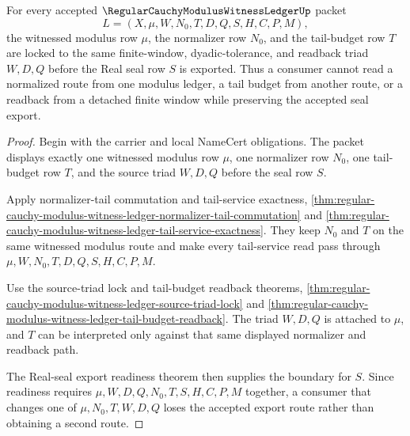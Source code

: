 
\begin{theorem}
\label{thm:regular-cauchy-modulus-witness-ledger-modulus-normalizer-tail-coherence}
For every accepted $\RegularCauchyModulusWitnessLedgerUp$ packet
$$
L=(X,\mu,W,N_0,T,D,Q,S,H,C,P,M),
$$
the witnessed modulus row $\mu$, the normalizer row $N_0$, and the tail-budget row $T$ are locked to the same finite-window, dyadic-tolerance, and readback triad $W,D,Q$ before the Real seal row $S$ is exported. Thus a consumer cannot read a normalized route from one modulus ledger, a tail budget from another route, or a readback from a detached finite window while preserving the accepted seal export.
\end{theorem}
\begin{proof}
Begin with the carrier and local NameCert obligations. The packet displays exactly one witnessed modulus row $\mu$, one normalizer row $N_0$, one tail-budget row $T$, and the source triad $W,D,Q$ before the seal row $S$.

Apply normalizer-tail commutation and tail-service exactness, \autoref{thm:regular-cauchy-modulus-witness-ledger-normalizer-tail-commutation} and \autoref{thm:regular-cauchy-modulus-witness-ledger-tail-service-exactness}. They keep $N_0$ and $T$ on the same witnessed modulus route and make every tail-service read pass through $\mu,W,N_0,T,D,Q,S,H,C,P,M$.

Use the source-triad lock and tail-budget readback theorems, \autoref{thm:regular-cauchy-modulus-witness-ledger-source-triad-lock} and \autoref{thm:regular-cauchy-modulus-witness-ledger-tail-budget-readback}. The triad $W,D,Q$ is attached to $\mu$, and $T$ can be interpreted only against that same displayed normalizer and readback path.

The Real-seal export readiness theorem then supplies the boundary for $S$. Since readiness requires $\mu,W,D,Q,N_0,T,S,H,C,P,M$ together, a consumer that changes one of $\mu,N_0,T,W,D,Q$ loses the accepted export route rather than obtaining a second route.
\end{proof}

